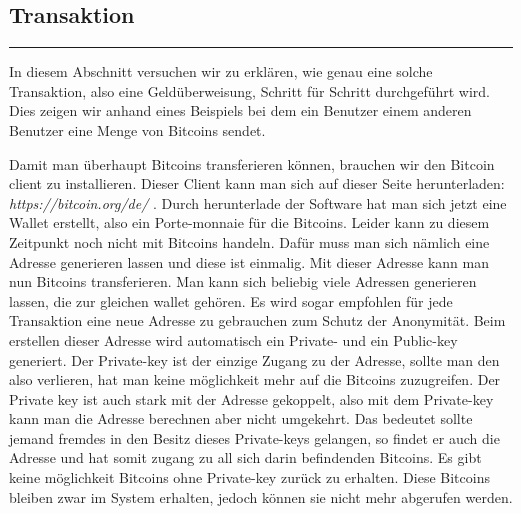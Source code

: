 \vspace*{1mm}
\subsection*{Transaktion}
\vspace{-10mm}
\noindent\rule{0.8\textwidth}{0.4pt}

\vspace{5mm}

\noindent
In diesem Abschnitt versuchen wir zu erklären, wie genau eine solche Transaktion, also eine Geldüberweisung, Schritt für Schritt durchgeführt wird.
Dies zeigen wir anhand eines Beispiels bei dem ein Benutzer einem anderen Benutzer eine Menge von Bitcoins sendet.

\noindent
Damit man überhaupt Bitcoins transferieren können, brauchen wir den Bitcoin client zu installieren. Dieser Client kann man sich auf dieser Seite herunterladen: \emph{\dq https://bitcoin.org/de/ \dq}.
Durch herunterlade der Software hat man sich jetzt eine Wallet erstellt, also ein Porte-monnaie für die Bitcoins. Leider kann zu diesem Zeitpunkt noch nicht mit Bitcoins handeln.
Dafür muss man sich nämlich eine Adresse generieren lassen und diese ist einmalig. Mit dieser Adresse kann man nun Bitcoins transferieren.
Man kann sich beliebig viele Adressen generieren lassen, die zur gleichen wallet gehören. Es wird sogar empfohlen für jede Transaktion eine neue Adresse zu gebrauchen zum Schutz der Anonymität.
Beim erstellen dieser Adresse wird automatisch ein Private- und ein Public-key generiert. Der Private-key ist der einzige Zugang zu der Adresse, sollte man den also verlieren, hat man keine möglichkeit mehr
auf die Bitcoins zuzugreifen. Der Private key ist auch stark mit der Adresse gekoppelt, also mit dem Private-key kann man die Adresse berechnen aber nicht umgekehrt. Das bedeutet sollte jemand fremdes in den
Besitz dieses Private-keys gelangen, so findet er auch die Adresse und hat somit zugang zu all sich darin befindenden Bitcoins. Es gibt keine möglichkeit Bitcoins ohne Private-key zurück zu erhalten.
Diese Bitcoins bleiben zwar im System erhalten, jedoch können sie nicht mehr abgerufen werden.

\noindent





\newpage
